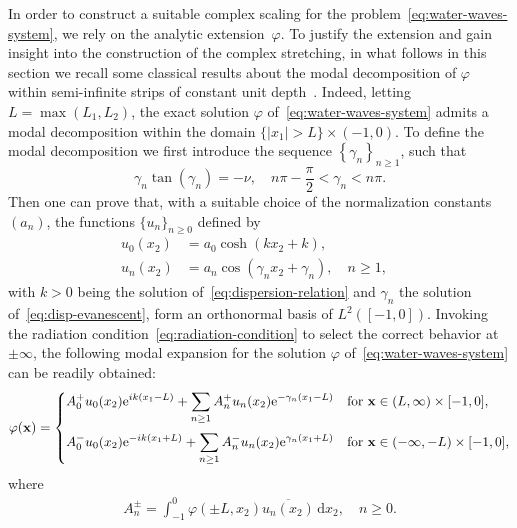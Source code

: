 \documentclass[review,hidelinks,onefignum,onetabnum]{siamart220329}
\newcommand{\e}{\mathrm{e}}
\newcommand{\bx}{\mathbf{x}}
\newcommand{\de}{\,\mathrm{d}}
\begin{document}
In order to construct a suitable complex scaling for the problem~\eqref{eq:water-waves-system}, we rely on the analytic extension~$\varphi$. To justify the extension and gain insight into the construction of the complex stretching,  in what follows in this section we recall some classical results about the modal decomposition of $\varphi$ within semi-infinite strips of constant unit depth~\cite{kuznetsov2002linear,linton2001handbook}. Indeed, letting $L = \max(L_1,L_2)$, the exact solution $\varphi$ of~\eqref{eq:water-waves-system} admits a modal decomposition within the domain $\{|x_1|>L\}\times(-1,0)$. To define the modal decomposition we first introduce the sequence $\left\{\gamma_n\right\}_{n\geq 1}$, such that
\begin{equation}
  \label{eq:disp-evanescent}
  \gamma_n\tan(\gamma_n)=-\nu,\quad n\pi-\frac{\pi}{2}<\gamma_n <n\pi.
\end{equation}
Then one can prove that, with a suitable choice of the normalization constants
$(a_n)$, the functions $\{ u_n \}_{n\geq 0}$ defined by 
\begin{align}
\label{eq:transversemodes}
u_0(x_2)&=a_0\cosh(kx_2+k),&\\
u_n(x_2)&=a_n\cos(\gamma_nx_2+\gamma_n), \quad n\geq 1,
\end{align}
with $k>0$ being the solution of~\cref{eq:dispersion-relation} and $\gamma_n$ the solution of~\cref{eq:disp-evanescent}, form an orthonormal basis of $L^2([-1,0])$. Invoking the radiation condition~\cref{eq:radiation-condition} to select the correct behavior at $\pm \infty$, the following modal expansion for the solution $\varphi$ of~\eqref{eq:water-waves-system} can be readily obtained:
%
\begin{align}
  \label{eq:modaldecomp}
  \varphi(\bx) = \begin{cases}
  \displaystyle A_0^+u_0(x_2)\e^{ik(x_1-L)} + \sum_{n\geq 1}A_n^+u_n(x_2)\e^{-\gamma_n(x_1-L)} &\mbox{for }\bx\in (L,\infty)\times [-1,0],\medskip\\
  \displaystyle A_0^-u_0(x_2)\e^{-ik(x_1+L)} +\sum_{n\geq 1}A_n^-u_n(x_2)\e^{\gamma_n(x_1+L)} &\mbox{for }\bx\in (-\infty,-L)\times [-1,0],
  \end{cases}
\end{align}
where 
\begin{align}\label{eq:modal-decomp-amplitude}
  A_n^\pm=\int_{-1}^0\varphi(\pm L,x_2)\overline{u_n(x_2)}\de x_2,\quad n\geq 0.  
\end{align}
\end{document}
